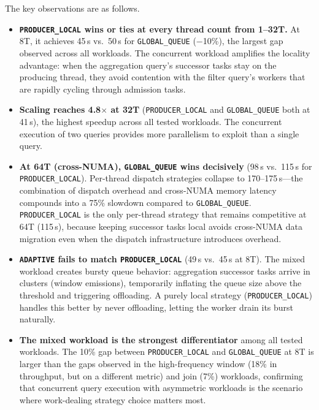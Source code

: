 The key observations are as follows.
%
\begin{itemize}
    \item \textbf{\texttt{PRODUCER\_LOCAL} wins or ties at every thread count from 1--32T.}
    At 8T, it achieves 45\,s vs.\ 50\,s for \texttt{GLOBAL\_QUEUE} ($-$10\%), the largest gap observed across all workloads.
    The concurrent workload amplifies the locality advantage: when the aggregation query's successor tasks stay on the producing thread, they avoid contention with the filter query's workers that are rapidly cycling through admission tasks.

    \item \textbf{Scaling reaches 4.8$\times$ at 32T} (\texttt{PRODUCER\_LOCAL} and \texttt{GLOBAL\_QUEUE} both at 41\,s), the highest speedup across all tested workloads.
    The concurrent execution of two queries provides more parallelism to exploit than a single query.

    \item \textbf{At 64T (cross-NUMA), \texttt{GLOBAL\_QUEUE} wins decisively} (98\,s vs.\ 115\,s for \texttt{PRODUCER\_LOCAL}).
    Per-thread dispatch strategies collapse to 170--175\,s---the combination of dispatch overhead and cross-NUMA memory latency compounds into a 75\% slowdown compared to \texttt{GLOBAL\_QUEUE}.
    \texttt{PRODUCER\_LOCAL} is the only per-thread strategy that remains competitive at 64T (115\,s), because keeping successor tasks local avoids cross-NUMA data migration even when the dispatch infrastructure introduces overhead.

    \item \textbf{\texttt{ADAPTIVE} fails to match \texttt{PRODUCER\_LOCAL}} (49\,s vs.\ 45\,s at 8T).
    The mixed workload creates bursty queue behavior: aggregation successor tasks arrive in clusters (window emissions), temporarily inflating the queue size above the threshold and triggering offloading.
    A purely local strategy (\texttt{PRODUCER\_LOCAL}) handles this better by never offloading, letting the worker drain its burst naturally.

    \item \textbf{The mixed workload is the strongest differentiator} among all tested workloads.
    The 10\% gap between \texttt{PRODUCER\_LOCAL} and \texttt{GLOBAL\_QUEUE} at 8T is larger than the gaps observed in the high-frequency window (18\% in throughput, but on a different metric) and join (7\%) workloads, confirming that concurrent query execution with asymmetric workloads is the scenario where work-dealing strategy choice matters most.
\end{itemize}

